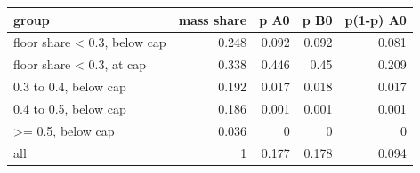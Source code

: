 \begin{tabular}{lrrrr}
\toprule
group & mass share & p A0 & p B0 & p(1-p) A0 \\
\midrule
floor share < 0.3, below cap & 0.248 & 0.092 & 0.092 & 0.081 \\
floor share < 0.3, at cap & 0.338 & 0.446 & 0.45 & 0.209 \\
0.3 to 0.4, below cap & 0.192 & 0.017 & 0.018 & 0.017 \\
0.4 to 0.5, below cap & 0.186 & 0.001 & 0.001 & 0.001 \\
>= 0.5, below cap & 0.036 & 0 & 0 & 0 \\
all & 1 & 0.177 & 0.178 & 0.094 \\
\bottomrule
\end{tabular}
